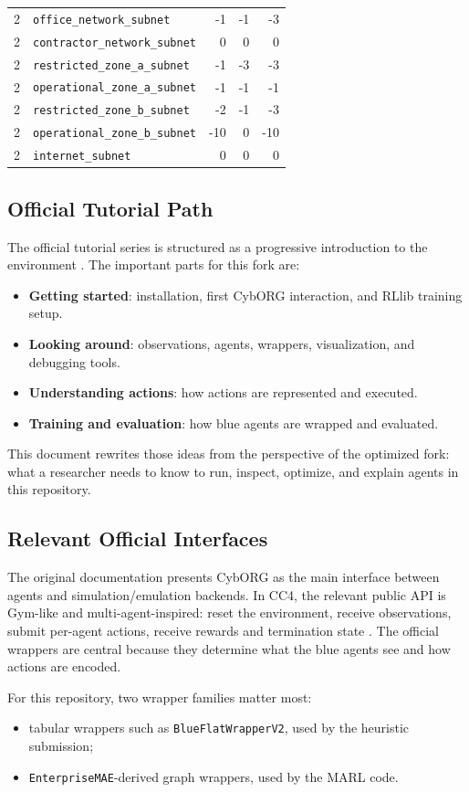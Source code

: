 \begin{longtable}{llrrr}
2 & \texttt{office\_network\_subnet} & -1 & -1 & -3 \\
2 & \texttt{contractor\_network\_subnet} & 0 & 0 & 0 \\
2 & \texttt{restricted\_zone\_a\_subnet} & -1 & -3 & -3 \\
2 & \texttt{operational\_zone\_a\_subnet} & -1 & -1 & -1 \\
2 & \texttt{restricted\_zone\_b\_subnet} & -2 & -1 & -3 \\
2 & \texttt{operational\_zone\_b\_subnet} & -10 & 0 & -10 \\
2 & \texttt{internet\_subnet} & 0 & 0 & 0 \\
\bottomrule
\end{longtable}

\subsection{Official Tutorial Path}

The official tutorial series is structured as a progressive introduction to the environment \cite{cc4_tutorials}. The important parts for this fork are:

\begin{itemize}
  \item \textbf{Getting started}: installation, first CybORG interaction, and RLlib training setup.
  \item \textbf{Looking around}: observations, agents, wrappers, visualization, and debugging tools.
  \item \textbf{Understanding actions}: how actions are represented and executed.
  \item \textbf{Training and evaluation}: how blue agents are wrapped and evaluated.
\end{itemize}

This document rewrites those ideas from the perspective of the optimized fork: what a researcher needs to know to run, inspect, optimize, and explain agents in this repository.

\subsection{Relevant Official Interfaces}

The original documentation presents CybORG as the main interface between agents and simulation/emulation backends. In CC4, the relevant public API is Gym-like and multi-agent-inspired: reset the environment, receive observations, submit per-agent actions, receive rewards and termination state \cite{cc4_cyborg_class}. The official wrappers are central because they determine what the blue agents see and how actions are encoded.

For this repository, two wrapper families matter most:
\begin{itemize}
  \item tabular wrappers such as \texttt{BlueFlatWrapperV2}, used by the heuristic submission;
  \item \texttt{EnterpriseMAE}-derived graph wrappers, used by the MARL code.
\end{itemize}
